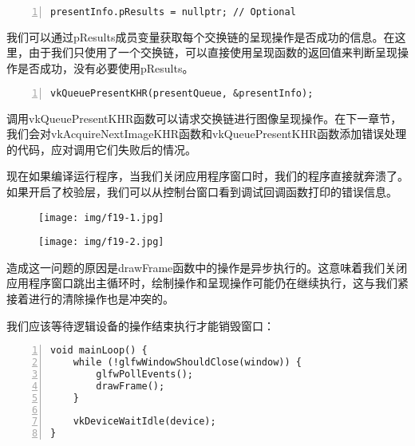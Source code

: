 \documentclass{ctexart}
\begin{document}
\begin{lstlisting}[language={[ANSI]C},keywordstyle=\color{blue!70},commentstyle=\color{red!50!green!50!blue!50},frame=shadowbox, rulesepcolor=\color{red!20!green!20!blue!20},basicstyle=\small,numbers=left, numberstyle=\tiny,breaklines=true]
presentInfo.pResults = nullptr; // Optional
\end{lstlisting}

我们可以通过pResults成员变量获取每个交换链的呈现操作是否成功的信息。在这里，由于我们只使用了一个交换链，可以直接使用呈现函数的返回值来判断呈现操作是否成功，没有必要使用pResults。

\begin{lstlisting}[language={[ANSI]C},keywordstyle=\color{blue!70},commentstyle=\color{red!50!green!50!blue!50},frame=shadowbox, rulesepcolor=\color{red!20!green!20!blue!20},basicstyle=\small,numbers=left, numberstyle=\tiny,breaklines=true]
vkQueuePresentKHR(presentQueue, &presentInfo);
\end{lstlisting}

调用vkQueuePresentKHR函数可以请求交换链进行图像呈现操作。在下一章节，我们会对vkAcquireNextImageKHR函数和vkQueuePresentKHR函数添加错误处理的代码，应对调用它们失败后的情况。

现在如果编译运行程序，当我们关闭应用程序窗口时，我们的程序直接就奔溃了。如果开启了校验层，我们可以从控制台窗口看到调试回调函数打印的错误信息。

\begin{figure}[H]
	\centering
	\texttt{[image: img/f19-1.jpg]}
\end{figure}

\begin{figure}[H]
	\centering
	\texttt{[image: img/f19-2.jpg]}
\end{figure}

造成这一问题的原因是drawFrame函数中的操作是异步执行的。这意味着我们关闭应用程序窗口跳出主循环时，绘制操作和呈现操作可能仍在继续执行，这与我们紧接着进行的清除操作也是冲突的。

我们应该等待逻辑设备的操作结束执行才能销毁窗口：

\begin{lstlisting}[language={[ANSI]C},keywordstyle=\color{blue!70},commentstyle=\color{red!50!green!50!blue!50},frame=shadowbox, rulesepcolor=\color{red!20!green!20!blue!20},basicstyle=\small,numbers=left, numberstyle=\tiny,breaklines=true]
void mainLoop() {
	while (!glfwWindowShouldClose(window)) {
		glfwPollEvents();
		drawFrame();
	}

	vkDeviceWaitIdle(device);
}
\end{lstlisting}
\end{document}
